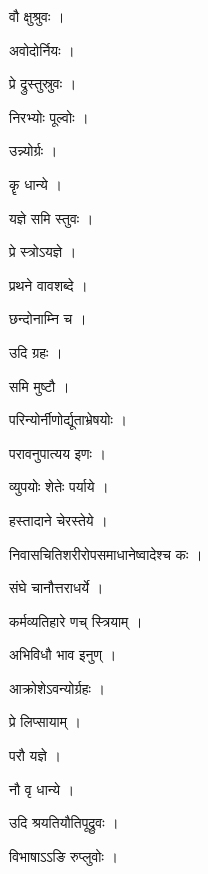 \documentclass[10pt, openany]{book}
\begin{document}
\noindent वौ क्षुश्रुवः ।

\noindent अवोदोर्नियः ।

\noindent प्रे द्रुस्तुस्रुवः ।

\noindent निरभ्योः पूल्वोः ।

\noindent उन्न्योर्ग्रः ।

\noindent कॄ धान्ये ।

\noindent यज्ञे समि स्तुवः ।

\noindent प्रे स्त्रोऽयज्ञे ।

\noindent प्रथने वावशब्दे ।

\noindent छन्दोनाम्नि च ।

\noindent उदि ग्रहः ।

\noindent समि मुष्टौ ।

\noindent परिन्योर्नीणोर्द्यूताभ्रेषयोः ।

\noindent परावनुपात्यय इणः ।

\noindent व्युपयोः शेतेः पर्याये ।

\noindent हस्तादाने चेरस्तेये ।

\noindent निवासचितिशरीरोपसमाधानेष्वादेश्च कः ।

\noindent संघे चानौत्तराधर्ये ।

\noindent कर्मव्यतिहारे णच् स्त्रियाम् ।

\noindent अभिविधौ भाव इनुण् ।

\noindent आक्रोशेऽवन्योर्ग्रहः ।

\noindent प्रे लिप्सायाम् ।

\noindent परौ यज्ञे ।

\noindent नौ वृ धान्ये ।

\noindent उदि श्रयतियौतिपूद्रुवः ।

\noindent विभाषाऽऽङि रुप्लुवोः ।
\end{document}
